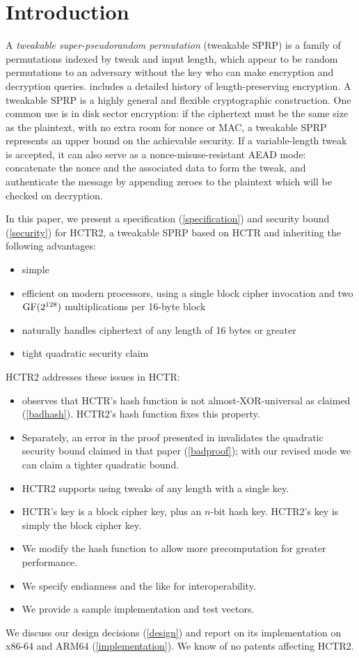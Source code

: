 \documentclass[hctr2.tex]{subfiles}
\begin{document}
\section{Introduction}

A \emph{tweakable super-pseudorandom permutation} (tweakable SPRP) is
a family of permutations indexed by tweak and input length, which
appear to be random permutations to an adversary without the key who
can make encryption and decryption queries\cite{cmc}. \cite{adiantum}
includes a detailed history of length-preserving encryption. A
tweakable SPRP is a highly general and flexible cryptographic
construction. One common use is in disk sector encryption: if the
ciphertext must be the same size as the plaintext, with no extra room
for nonce or MAC, a tweakable SPRP represents an upper bound on the
achievable security. If a variable-length tweak is accepted, it can
also serve as a nonce-misuse-resistant AEAD mode: concatenate the
nonce and the associated data to form the tweak, and authenticate the
message by appending zeroes to the plaintext which will be checked on
decryption\cite{encodethenencrypt, aez}.


In this paper, we present a specification (\autoref{specification})
and security bound (\autoref{security}) for HCTR2, a tweakable SPRP
based on HCTR\cite{hctr} and inheriting the following advantages:
\begin{itemize}
    \item simple
    \item efficient on modern processors, using a single block cipher
    invocation and two \(\operatorname{GF}(2^{128})\) multiplications per 16-byte
    block
    \item naturally handles ciphertext of any length of 16 bytes or greater
    \item tight quadratic security claim
\end{itemize}
HCTR2 addresses these issues in HCTR:
\begin{itemize}
    \item \cite{kumarhctr} observes that HCTR's hash function
    is not almost-XOR-universal\cite{eadu} as claimed (\autoref{badhash}).
    HCTR2's hash function fixes this property.
    \item Separately,
    an error in the proof presented in \cite{hctrquad}
    invalidates the quadratic security bound claimed in that paper (\autoref{badproof}); with our revised
    mode we can claim a tighter quadratic bound.
    \item HCTR2 supports using tweaks of any length with a single key.
    \item HCTR's key is a block cipher key, plus an \(n\)-bit
    hash key. HCTR2's key is simply
    the block cipher key.
    \item We modify the hash function to allow more precomputation
    for greater performance.
    \item We specify endianness and the like for interoperability.
    \item We provide a sample implementation and test vectors.
\end{itemize}
We discuss our design decisions (\autoref{design})
and report on its implementation on x86-64 and ARM64 (\autoref{implementation}).
We know of no patents affecting HCTR2.
\end{document}

